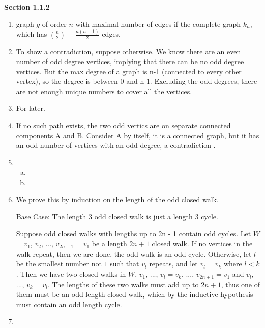 \documentclass[11pt]{article}
\begin{document}
{\bfseries Section 1.1.2}

\begin{enumerate}[1]
    \item %
        graph $g$ of order $n$ with maximal number of edges if the complete graph
        $k_n$, which has $\binom{n}{2} = \frac{n(n-1)}{2}$ edges.
    \item %
        To show a contradiction, suppose otherwise. We know there are an even 
        number of odd degree vertices, implying that there can be no odd 
        degree vertices. But the max degree of a graph is n-1 (connected to 
        every other vertex), so the degree is between 0 and n-1. Excluding 
        the odd degrees, there are not enough unique numbers to cover all the
        vertices.
    \item %
        For later.
    \item %
        If no such path exists, the two odd vertics are on separate connected 
        components A and B. Consider A by itself, it is a connected graph, 
        but it has an odd number of vertices with an odd degree, a contradiction
        . 
    \item %
        \begin{enumerate}[a)]
            \item 
                
            \item 
        \end{enumerate}
    \item %
        We prove this by induction on the length of the odd closed walk. 

        Base Case: The length 3 odd closed walk is just a length 3 cycle.

        Suppose odd closed walks with lengths up to 2n - 1 contain odd cycles.
        Let $W$ = $v_1$, $v_2$, ..., $v_{2n+1} = v_1$ be a length $2n+1$ closed walk. 
        If no vertices in the walk repeat, then we are done, the odd walk is an
        odd cycle. Otherwise, let $l$ be the smallest number not $1$ such that $v_l$ 
        repeats, and let $v_l = v_k$ where $l < k$. Then we have two closed walks 
        in $W$, $v_1$, ..., $v_l = v_k$, ..., $v_{2n+1} = v_1$ and $v_l$, ..., 
        $v_k = v_l$. The lengths of these two walks must add up to $2n+1$, thus one
        of them must be an odd length closed walk, which by the inductive hypothesis
        must contain an odd length cycle. 


    \item %


\end{enumerate}
\end{document}
